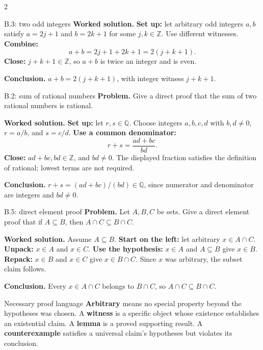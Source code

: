\documentclass[10pt]{article}
\newcommand{\term}[1]{\textbf{\color{CoreNavy}#1}}
\begin{document}
\begin{multicols}{2}
\begin{workedbox}{B.3: two odd integers}
\textbf{Worked solution.} \textbf{Set up:} let arbitrary odd integers $a,b$ satisfy $a=2j+1$ and
$b=2k+1$ for some $j,k\in\mathbb Z$. Use different witnesses. \textbf{Combine:}
\[
a+b=2j+1+2k+1=2(j+k+1).
\]
\textbf{Close:} $j+k+1\in\mathbb Z$, so $a+b$ is twice an integer and is even.

\textbf{Conclusion.} $a+b=2(j+k+1)$, with integer witness $j+k+1$.
\end{workedbox}


\begin{workedbox}{B.2: sum of rational numbers}
\textbf{Problem.} Give a direct proof that the sum of two rational numbers is rational.

\textbf{Worked solution.} \textbf{Set up:} let $r,s\in\mathbb Q$. Choose integers $a,b,c,d$ with
$b,d\ne0$, $r=a/b$, and $s=c/d$. \textbf{Use a common denominator:}
\[
r+s=\frac{ad+bc}{bd}.
\]
\textbf{Close:} $ad+bc,bd\in\mathbb Z$, and $bd\ne0$. The displayed fraction
satisfies the definition of rational; lowest terms are not required.

\textbf{Conclusion.} $r+s=(ad+bc)/(bd)\in\mathbb Q$, since numerator and denominator are integers and $bd\ne0$.
\end{workedbox}

\begin{workedbox}{B.5: direct element proof}
\textbf{Problem.} Let $A,B,C$ be sets. Give a direct element proof that if $A\subseteq B$, then $A\cap C\subseteq B\cap C$.

\textbf{Worked solution.} Assume $A\subseteq B$. \textbf{Start on the left:} let arbitrary
$x\in A\cap C$. \textbf{Unpack:} $x\in A$ and $x\in C$. \textbf{Use the
hypothesis:} $x\in A$ and $A\subseteq B$ give $x\in B$. \textbf{Repack:}
$x\in B$ and $x\in C$ give $x\in B\cap C$. Since $x$ was arbitrary, the
subset claim follows.

\textbf{Conclusion.} Every $x\in A\cap C$ belongs to $B\cap C$, so $A\cap C\subseteq B\cap C$.
\end{workedbox}

\begin{definitionbox}{Necessary proof language}
\term{Arbitrary} means no special property beyond the hypotheses was chosen.
A \term{witness} is a specific object whose existence establishes an
existential claim. A \term{lemma} is a proved supporting result. A
\term{counterexample} satisfies a universal claim's hypotheses but violates
its conclusion.
\end{definitionbox}


\end{multicols}
\end{document}
